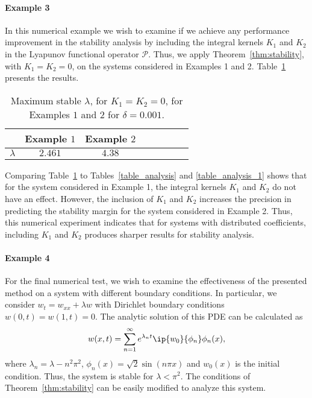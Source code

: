 \documentclass[9pt,journal,twocolumn]{IEEEtran}
\begin{document}
\paragraph*{Example 3} In this numerical example we wish to examine if we achieve any performance improvement in the stability analysis by including the integral kernels $K_1$ and $K_2$ in the Lyapunov functional operator $\mathcal{P}$. Thus, we apply Theorem~\ref{thm:stability}, with $K_1=K_2=0$, on the systems considered in Examples 1 and 2. Table~\ref{table_comparison_analysis} presents the results.
\begin{table}{}
\begin{center}
    \begin{tabular}{l *{7}{c}}\hline \hline
 & Example $1$ & Example $2$ \\ \hline
$\lambda$ &  $2.461$ & $4.38$ 
\end{tabular}
\end{center}
\caption{Maximum stable $\lambda$, for $K_1=K_2=0$, for Examples $1$ and $2$ for $\delta=0.001$.}
\label{table_comparison_analysis}
\end{table}
 Comparing Table~\ref{table_comparison_analysis} to Tables~\ref{table_analysis} and \ref{table_analysis_1} shows that for the system considered in Example 1, the integral kernels $K_1$ and $K_2$ do not have an effect. However, the inclusion of $K_1$ and $K_2$ increases the precision in predicting the stability margin for the system considered in Example 2. Thus, this numerical experiment indicates that for systems with distributed coefficients, including $K_1$ and $K_2$ produces sharper results for stability analysis.

\paragraph*{Example 4} For the final numerical test, we wish to examine the effectiveness of the presented method on a system with different boundary conditions. In particular, we consider $w_t=w_{xx}+\lambda w$ with Dirichlet boundary conditions $w(0,t)=w(1,t)=0$. The analytic solution of this PDE can be calculated as
\[w(x,t)=\sum_{n=1}^\infty e^{\lambda_n t} \ip{w_0}{\phi_n}\phi_n(x),\] where $\lambda_n=\lambda-n^2 \pi^2$, $\phi_n(x)=\sqrt{2}\sin (n \pi x)$ and $w_0(x)$ is the initial condition. Thus, the system is stable for $\lambda < \pi^2$. The conditions of Theorem~\ref{thm:stability} can be easily modified to analyze this system. 
\end{document}
